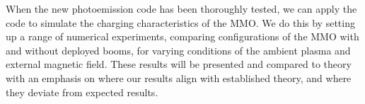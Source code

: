 When the new photoemission code has been thoroughly tested, we can apply the code to simulate the charging characteristics of the MMO. We do this by setting up a range of numerical experiments, comparing configurations of the MMO with and without deployed booms, for varying conditions of the ambient plasma and external magnetic field. These results will be presented and compared to theory with an emphasis on where our results align with established theory, and where they deviate from expected results. 
\newpage